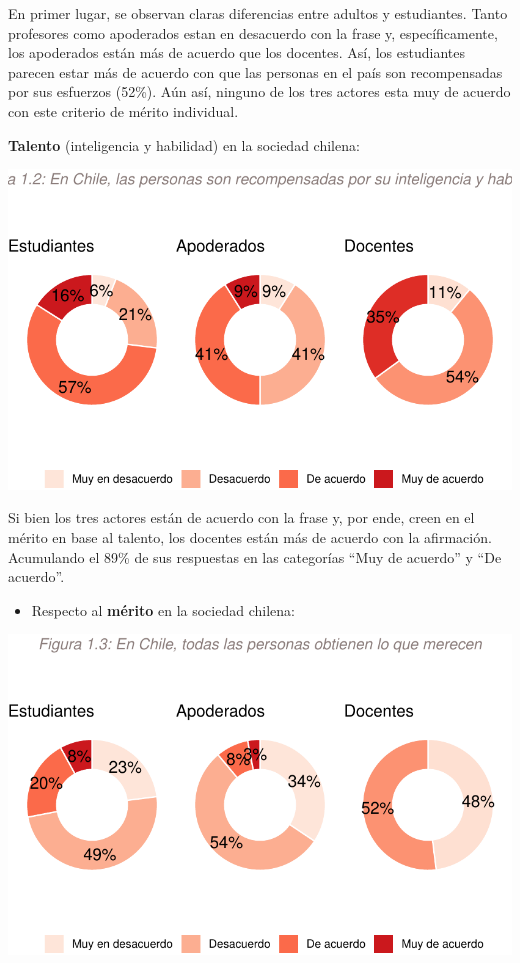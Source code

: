 \documentclass[
  letterpaper,
  DIV=11,
  numbers=noendperiod]{scrartcl}
\providecommand{\tightlist}{%
  \setlength{\itemsep}{0pt}\setlength{\parskip}{0pt}}\usepackage{longtable,booktabs,array}
\begin{document}
En primer lugar, se observan claras diferencias entre adultos y
estudiantes. Tanto profesores como apoderados estan en desacuerdo con la
frase y, específicamente, los apoderados están más de acuerdo que los
docentes. Así, los estudiantes parecen estar más de acuerdo con que las
personas en el país son recompensadas por sus esfuerzos (52\%). Aún así,
ninguno de los tres actores esta muy de acuerdo con este criterio de
mérito individual.

\textbf{Talento} (inteligencia y habilidad) en la sociedad chilena:

\includegraphics{doc-colegios-con-profes-y-apoderados_files/figure-pdf/unnamed-chunk-7-1.pdf}

Si bien los tres actores están de acuerdo con la frase y, por ende,
creen en el mérito en base al talento, los docentes están más de acuerdo
con la afirmación. Acumulando el 89\% de sus respuestas en las
categorías ``Muy de acuerdo'' y ``De acuerdo''.

\begin{itemize}
\tightlist
\item
  Respecto al \textbf{mérito} en la sociedad chilena:
\end{itemize}

\includegraphics{doc-colegios-con-profes-y-apoderados_files/figure-pdf/unnamed-chunk-9-1.pdf}
\end{document}
